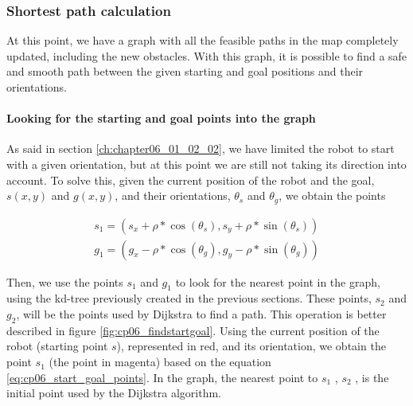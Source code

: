 \subsubsection{Shortest path calculation}\label{ch:chapter06_01_02_04}

At this point, we have a graph with all the feasible paths in the map completely updated, including the new obstacles. With this graph, it is possible to find a safe and smooth path between the given starting and goal positions and their orientations.

\paragraph{Looking for the starting and goal points into the graph}\label{ch:chapter06_01_02_04_01}

As said in section \ref{ch:chapter06_01_02_02}, we have limited the robot to start with a given orientation, but at this point we are still not taking its direction into account. To solve this, given the current position of the robot and the goal, $s(x,y)$ and $g(x,y)$, and their orientations, $\theta_s$ and $\theta_g$, we obtain the points

\begin{equation}\label{eq:cp06_start_goal_points}
\begin {array}{l}
 s_1 = (s_x + \rho * \cos(\theta_s), s_y + \rho * \sin(\theta_s)) \\
 g_1 = (g_x - \rho * \cos(\theta_g), g_y - \rho * \sin(\theta_g))
\end{array}
\end{equation}

Then, we use the points $s_1$ and $g_1$ to look for the nearest point in the graph, using the kd-tree previously created in the previous sections. These points, $s_2$ and $g_2$, will be the points used by Dijkstra to find a path. This operation is better described in figure \ref{fig:cp06_findstartgoal}. Using the current position of the robot (starting point $s$), represented in red, and its orientation, we obtain the point $s_1$ (the point in magenta) based on the equation \ref{eq:cp06_start_goal_points}. In the graph, the nearest point to $s_1$ , $s_2$ , is the initial point used by the Dijkstra algorithm.

